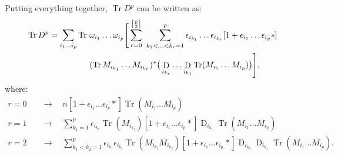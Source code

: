 \documentclass[12pt,a4paper]{article}
\DeclareMathOperator{\Tr}{Tr}
\DeclareMathOperator{\D}{D}
\begin{document}
Putting everything together, $\Tr D^p$ can be written as:
\begin{align}
\Tr D^p = \sum_{i_1 \ldots i_p} \Tr \ &\omega_{i_1} \ldots \omega_{i_p} \Bigg[ \sum_{r=0}^{\left[\frac{p}{2}\right]} \ \sum_{k_1 < \ldots < k_r = 1}^p  \epsilon_{i_{k_1}} \ldots \epsilon_{i_{k_r}} [1 + \epsilon_{i_1} \ldots \epsilon_{i_p} * ] \notag \\
&(\Tr M_{i_{k_1}} \ldots M_{i_{k_r}})^* \big( \D_{i_{k_r}} \ldots \D_{i_{k_1}} \Tr (M_{i_1} \ldots M_{i_p}) \big) \Bigg]. \notag \\
\end{align}
where:
\begin{align}
r=0 \quad &\longrightarrow \quad n[1+\epsilon_{i_1} \ldots \epsilon_{i_p}*]\Tr (M_{i_1} \ldots M_{i_p}) \\
r=1 \quad &\longrightarrow \quad \sum_{k_1 = 1}^p \epsilon_{i_{k_1}}  \Tr (M_{i_{k_1}}) [1+\epsilon_{i_1} \ldots \epsilon_{i_p}*] \D_{i_{k_1}} \Tr (M_{i_1} \ldots M_{i_p}) \\
r=2 \quad &\longrightarrow \quad \sum_{k_1<k_2 = 1}^p \epsilon_{i_{k_1}} \epsilon_{i_{k_2}}  \Tr (M_{i_{k_1}} M_{i_{k_2}}) [1+\epsilon_{i_1} \ldots \epsilon_{i_p}*] \D_{i_{k_2}} \D_{i_{k_1}} \Tr (M_{i_1} \ldots M_{i_p}).
\end{align}
\end{document}
